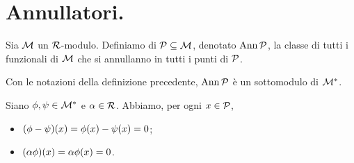 \section{Annullatori.}
\label{TeoriaDeiModuli_Annullatori}
\begin{Definition}
	Sia $\mathcal{M}$ un $\mathcal{R}$-modulo. Definiamo  di $\mathcal{P} \subseteq \mathcal{M}$, denotato $\operatorname{Ann}{\mathcal{P}}$, la classe di tutti i funzionali di $\mathcal{M}$ che si annullanno in tutti i punti di $\mathcal{P}$.
\end{Definition}
\begin{Theorem}
	Con le notazioni della definizione precedente, $\operatorname{Ann}{\mathcal{P}}$ \`e un sottomodulo di ${{\mathcal{M}}^*}$.
\end{Theorem}
\Proof Siano $\phi, \psi \in {{\mathcal{M}}^*}$ e $\alpha \in \mathcal{R}$. Abbiamo, per ogni $x \in \mathcal{P}$,
\begin{itemize}
	\item $(\phi - \psi)(x) = \phi(x) - \psi(x) = 0$;
	\item $(\alpha\phi)(x) = \alpha \phi(x) = 0$. \EndProof
\end{itemize}
